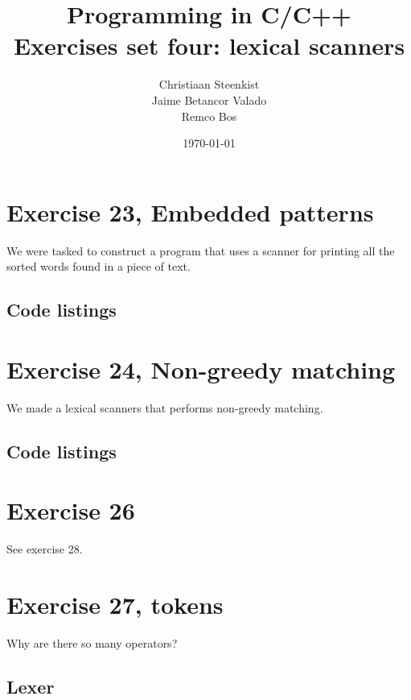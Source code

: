 \documentclass[11pt]{article}
\begin{document}
\title{Programming in C/C++ \\
       Exercises set four: lexical scanners
}
\date{\today}
\author{Christiaan Steenkist \\
Jaime Betancor Valado \\
Remco Bos \\
}

\maketitle
\section*{Exercise 23, Embedded patterns}
We were tasked to construct a program that uses a scanner for printing all the sorted words found in a piece of text.
\subsection*{Code listings}




\section*{Exercise 24, Non-greedy matching}
We made a lexical scanners that performs non-greedy matching.

\subsection*{Code listings}





\section*{Exercise 26}
See exercise 28.

\section*{Exercise 27, tokens}
Why are there so many operators?

\subsection*{Lexer}

\end{document}
